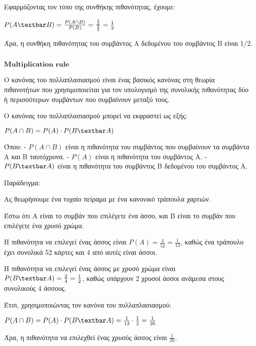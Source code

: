 \documentclass[11pt]{article}
\makeatletter
\newcommand{\boxspacing}{\kern\kvtcb@left@rule\kern\kvtcb@boxsep}
\newcommand{\prompt}[4]{
        {\ttfamily\llap{{\color{#2}[#3]:\hspace{3pt}#4}}\vspace{-\baselineskip}}
    }
\makeatother
\begin{document}
Εφαρμόζοντας τον τύπο της συνθήκης πιθανότητας, έχουμε:

$ P(A\textbar B) = \frac{P(A \cap B)}{P(B)} =
\frac{\frac{1}{3}}{\frac{2}{3}} = \frac{1}{2} $

Άρα, η συνθήκη πιθανότητας του συμβάντος Α δεδομένου του συμβάντος Β
είναι 1/2.

    \begin{tcolorbox}[breakable, size=fbox, boxrule=1pt, pad at break*=1mm,colback=cellbackground, colframe=cellborder]
\prompt{In}{incolor}{ }{\boxspacing}
\begin{Verbatim}[commandchars=\\\{\}]

\end{Verbatim}
\end{tcolorbox}

    \(\textbf{Multiplication rule}\)

    Ο κανόνας του πολλαπλασιασμού είναι ένας βασικός κανόνας στη θεωρία
πιθανοτήτων που χρησιμοποιείται για τον υπολογισμό της συνολικής
πιθανότητας δύο ή περισσότερων συμβάντων που συμβαίνουν μεταξύ τους.

Ο κανόνας του πολλαπλασιασμού μπορεί να εκφραστεί ως εξής:

$ P(A \cap B) = P(A) \cdot P(B\textbar A) $

Όπου: - $ P(A \cap B) $ είναι η πιθανότητα του συμβάντος που
συμβαίνουν τα συμβάντα A και B ταυτόχρονα. - $ P(A) $ είναι η
πιθανότητα του συμβάντος A. - $ P(B\textbar A) $ είναι η πιθανότητα
του συμβάντος B δεδομένου του συμβάντος A.

Παράδειγμα:

Ας θεωρήσουμε ένα τυχαίο πείραμα με ένα κανονικό τράπουλα χαρτιών.

Έστω ότι Α είναι το συμβάν που επιλέγετε ένα άσσο, και Β είναι το συμβάν
που επιλέγετε ένα χρυσό χρώμα.

Η πιθανότητα να επιλεγεί ένας άσσος είναι $ P(A) = \frac{4}{52} =
\frac{1}{13} $, καθώς ένα τράπουλο έχει συνολικά 52 κάρτες και 4 από
αυτές είναι άσσοι.

Η πιθανότητα να επιλεγεί ένας άσσος με χρυσό χρώμα είναι $
P(B\textbar A) = \frac{2}{4} = \frac{1}{2} $, καθώς υπάρχουν 2 χρυσοί
άσσοι ανάμεσα στους συνολικούς 4 άσσους.

Έτσι, χρησιμοποιώντας τον κανόνα του πολλαπλασιασμού:

$ P(A \cap B) = P(A) \cdot P(B\textbar A) = \frac{1}{13}
\cdot \frac{1}{2} = \frac{1}{26} $

Άρα, η πιθανότητα να επιλεχθεί ένας χρυσός άσσος είναι $ \frac{1}{26}
$.
\end{document}

